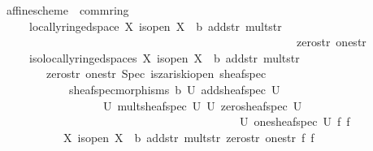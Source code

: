 \documentclass[12pt]{scrartcl}
\begin{document}
\begin{isabelle}
\isamarkupfalse%
\ affine{\isacharunderscore}{\kern0pt}scheme\ {\isacharequal}{\kern0pt}\ comm{\isacharunderscore}{\kern0pt}ring\ \isanewline
\ \ \ \ {\isacharplus}{\kern0pt}\ locally{\isacharunderscore}{\kern0pt}ringed{\isacharunderscore}{\kern0pt}space\ X\ is{\isacharunderscore}{\kern0pt}open\ {\isasymO}\isactrlsub X\ {\isasymrho}\ b\ add{\isacharunderscore}{\kern0pt}str\ mult{\isacharunderscore}{\kern0pt}str\ \isanewline
\ \ \ \ \ \ \ \ \ \ \ \ \ \ \ \ \ \ \ \ \ \ \ \ \ \ \ \ \ \ \ \ \ \ \ \ \ \ \ \ \ \ \ \ \ \ \ \ \ \ \ \ zero{\isacharunderscore}{\kern0pt}str\ one{\isacharunderscore}{\kern0pt}str\ \isanewline
\ \ \ \ {\isacharplus}{\kern0pt}\ iso{\isacharunderscore}{\kern0pt}locally{\isacharunderscore}{\kern0pt}ringed{\isacharunderscore}{\kern0pt}spaces\ X\ is{\isacharunderscore}{\kern0pt}open\ {\isasymO}\isactrlsub X\ {\isasymrho}\ b\ add{\isacharunderscore}{\kern0pt}str\ mult{\isacharunderscore}{\kern0pt}str\isanewline
\ \ \ \ \ \ \ \ zero{\isacharunderscore}{\kern0pt}str\ one{\isacharunderscore}{\kern0pt}str\ {\isachardoublequoteopen}Spec{\isachardoublequoteclose}\ is{\isacharunderscore}{\kern0pt}zariski{\isacharunderscore}{\kern0pt}open\ sheaf{\isacharunderscore}{\kern0pt}spec\ \isanewline
\ \ \ \ \ \ \ \ \ \ \ \ sheaf{\isacharunderscore}{\kern0pt}spec{\isacharunderscore}{\kern0pt}morphisms\ {\isasymO}b\ {\isachardoublequoteopen}{\isasymlambda}U{\isachardot}{\kern0pt}\ add{\isacharunderscore}{\kern0pt}sheaf{\isacharunderscore}{\kern0pt}spec\ U{\isachardoublequoteclose}\isanewline
\ \ \ \ \ \ \ \ \ \ \ \ \ \ \ \ \ \ {\isachardoublequoteopen}{\isasymlambda}U{\isachardot}{\kern0pt}\ mult{\isacharunderscore}{\kern0pt}sheaf{\isacharunderscore}{\kern0pt}spec\ U{\isachardoublequoteclose}\ {\isachardoublequoteopen}{\isasymlambda}U{\isachardot}{\kern0pt}\ zero{\isacharunderscore}{\kern0pt}sheaf{\isacharunderscore}{\kern0pt}spec\ U{\isachardoublequoteclose}\ \isanewline
\ \ \ \ \ \ \ \ \ \ \ \ \ \ \ \ \ \ \ \ \ \ \ \ \ \ \ \ \ \ \ \ \ \ \ \ \ \ \ \ \ \ {\isachardoublequoteopen}{\isasymlambda}U{\isachardot}{\kern0pt}\ one{\isacharunderscore}{\kern0pt}sheaf{\isacharunderscore}{\kern0pt}spec\ U{\isachardoublequoteclose}\ f\ {\isasymphi}\isactrlsub f\isanewline
\ \ \ \ \ \ \ \ \ \ \ X\ is{\isacharunderscore}{\kern0pt}open\ {\isasymO}\isactrlsub X\ {\isasymrho}\ b\ add{\isacharunderscore}{\kern0pt}str\ mult{\isacharunderscore}{\kern0pt}str\ zero{\isacharunderscore}{\kern0pt}str\ one{\isacharunderscore}{\kern0pt}str\ f\ {\isasymphi}\isactrlsub f
\end{isabelle}
\end{document}
